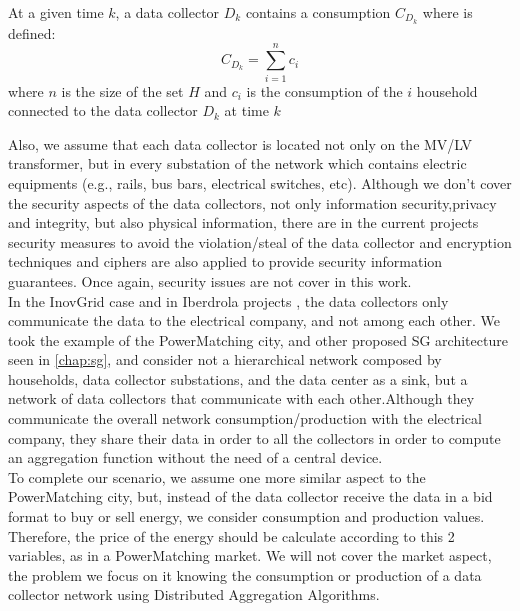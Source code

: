 \begin{definition}
At a given time $k$, a data collector $D_k$ contains a consumption $C_{D_k}$ where is defined:
\begin{equation*}
C_{D_k} =  \sum_{i=1}^{n} c_{i}
\end{equation*}
where $n$ is the size of the set $H$ and $c_{i}$ is the consumption of the $i$ household connected to the data collector $D_k$ at time $k$
\end{definition}
 Also, we assume that each data collector is located not only on the MV/LV transformer, but in every substation of the network which contains electric equipments (e.g., rails, bus bars, electrical switches, etc). Although we don't cover the security aspects of the data collectors, not only information security,privacy and integrity, but also physical information, there are in the current projects security measures to avoid the violation/steal of the data collector and encryption techniques and ciphers are also applied to provide security information guarantees. Once again, security issues are not cover in this work. \\
In the InovGrid case \cite{matos2013inovgrid} and in Iberdrola projects \cite{sendin2012performance}, the data collectors only communicate the data to the electrical company, and not among each other. We took the example of the PowerMatching city, and other proposed SG architecture seen in \ref{chap:sg}, and consider not a hierarchical network composed by households, data collector substations, and the data center as a sink, but a network of data collectors that communicate with each other.Although they communicate the overall network consumption/production with the electrical company, they share their data in order to all the collectors in order to compute an aggregation function without the need of a central device.\\
To complete our scenario, we assume one more similar aspect to the PowerMatching city, but, instead of the data collector receive the data in a bid format to buy or sell energy, we consider consumption and production values. Therefore, the price of the energy should be calculate according to this 2 variables, as in a PowerMatching market. We will not cover the market aspect, the problem we focus on it knowing the consumption or production of a data collector network using Distributed Aggregation Algorithms.\\
